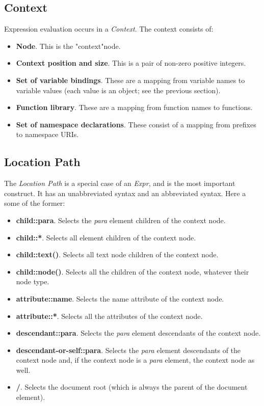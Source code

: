 \subsection{Context}
\label{subsec:xpath_context}

   Expression evaluation occurs in a \textsl{Context}.
   The context consists of:

   \begin{itemize}
      \item \textbf{Node}.
         This is the "context"node.
      \item \textbf{Context position and size}.
         This is a pair of non-zero positive integers.
      \item \textbf{Set of variable bindings}.
         These are a mapping from variable names to
         variable values (each value is an object; see the
         previous section).
      \item \textbf{Function library}.
         These are a mapping from function names to
         functions.
      \item \textbf{Set of namespace declarations}.
         These consist of a mapping from prefixes to namespace URIs.
   \end{itemize}

\subsection{Location Path}
\label{subsec:xpath_location_path}

   The \textsl{Location Path} is a special case of an
   \textsl{Expr}, and is the most important construct.
   It has an unabbreviated syntax and an abbreviated syntax.
   Here a some of the former:

   \begin{itemize}
      \item \textbf{child::para}.
         Selects the \textsl{para} element children of the context node.
      \item \textbf{child::*}.
         Selects all element children of the context node.
      \item \textbf{child::text()}.
         Selects all text node children of the context node.
      \item \textbf{child::node()}.
         Selects all the children of the context node,
         whatever their node type.
      \item \textbf{attribute::name}.
         Selects the name attribute of the context node.
      \item \textbf{attribute::*}.
         Selects all the attributes of the context node.
      \item \textbf{descendant::para}.
         Selects the \textsl{para} element descendants of the context node.
      \item \textbf{descendant-or-self::para}.
         Selects the \textsl{para} element descendants of the context node
         and, if the context node is a \textsl{para} element, the context
         node as well.
      \item \textbf{/}.
         Selects the document root (which is always the parent of the
         document element).
   \end{itemize}

